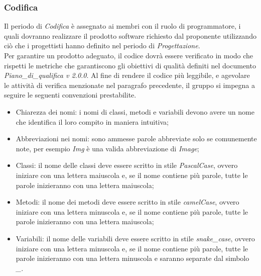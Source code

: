 	\subsubsection{Codifica}
	Il periodo di \textit{Codifica} è assegnato ai membri con il ruolo di programmatore, i quali dovranno realizzare il prodotto software richiesto dal proponente utilizzando ciò che i progettisti hanno definito nel periodo di \textit{Progettazione}.\\
	Per garantire un prodotto adeguato, il codice dovrà essere verificato in modo che rispetti le metriche che garantiscono gli obiettivi di qualità definiti nel documento \textit{Piano\_di\_qualifica v 2.0.0}.
	Al fine di rendere il codice più leggibile, e agevolare le attività di verifica menzionate nel paragrafo precedente, il gruppo si impegna a seguire le seguenti convenzioni prestabilite.
    \begin{itemize}
        \item Chiarezza dei nomi: i nomi di classi, metodi e variabili devono avere un nome che identifica il loro compito in maniera intuitiva;
        \item Abbreviazioni nei nomi: sono ammesse parole abbreviate solo se comunemente note, per esempio \textit{Img} è una valida abbreviazione di \textit{Image};
		\item Classi: il nome delle classi deve essere scritto in stile \textit{PascalCase}, ovvero iniziare con una lettera maiuscola e, se il nome contiene più parole, tutte le parole inizieranno con una lettera maiuscola;
		\item Metodi: il nome dei metodi deve essere scritto in stile \textit{camelCase}, ovvero iniziare con una lettera minuscola e, se il nome contiene più parole, tutte le parole inizieranno con una lettera maiuscola;
		\item Variabili: il nome delle variabili deve essere scritto in stile \textit{snake\_case}, ovvero iniziare con una lettera minuscola e, se il nome contiene più parole, tutte le parole inizieranno con una lettera minuscola e saranno separate dal simbolo \textit{\_}.
    \end{itemize}
    
